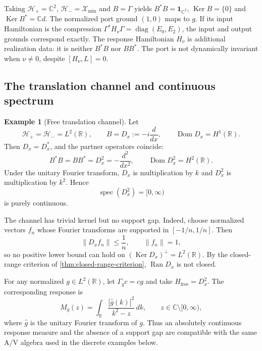 \documentclass[11pt,reqno]{scrartcl}
\newcommand{\CC}{\mathbb C}
\newcommand{\RR}{\mathbb R}
\newcommand{\scrHp}{\mathscr H_{+}}
\newcommand{\scrHm}{\mathscr H_{-}}
\newcommand{\idop}{\mathbf 1}
\DeclareMathOperator{\Dom}{Dom}
\DeclareMathOperator{\Ran}{Ran}
\DeclareMathOperator{\Ker}{Ker}
\DeclareMathOperator{\spec}{spec}
\DeclareMathOperator{\diag}{diag}
\newcommand{\Hmin}{\mathscr X_{\min}}
\theoremstyle{plain}
\theoremstyle{definition}
\newtheorem{example}[example]{Example}
\theoremstyle{remark}
\begin{document}
Taking $\scrHp=\CC^2$, $\scrHm=\Hmin$ and $B=\Gamma$ yields
$B^*B=\idop_{\CC^2}$, $\Ker B=\{0\}$ and $\Ker B^*=\CC d$.
The normalized port ground $(1,0)$ maps to $g$.  If its input Hamiltonian
is the compression $\Gamma^*H_\nu\Gamma=\diag(E_0,E_2)$, the input
and output grounds correspond exactly.  The response Hamiltonian
$H_\nu$ is additional realization data: it is neither $B^*B$ nor $BB^*$.
The port is not dynamically invariant when $\nu\ne0$, despite
$[H_\nu,L]=0$.


\subsection{The translation channel and continuous spectrum}

\begin{example}[Free translation channel]
\label{ex:translation-channel}
Let
\begin{equation}
  \scrHp=\scrHm=L^2(\RR),
  \qquad
  B=D_x:=-i\frac{d}{dx},
  \qquad
  \Dom D_x=H^1(\RR).
  \label{eq:translation-channel}
\end{equation}
Then \(D_x=D_x^*\), and the partner operators coincide:
\begin{equation}
  B^*B=BB^*=D_x^2=-\frac{d^2}{dx^2},
  \qquad
  \Dom D_x^2=H^2(\RR).
  \label{eq:free-partner}
\end{equation}
Under the unitary Fourier transform, \(D_x\) is multiplication by \(k\) and
\(D_x^2\) is multiplication by \(k^2\).  Hence
\begin{equation}
  \spec(D_x^2)=[0,\infty)
  \label{eq:free-spectrum}
\end{equation}
is purely continuous.
\end{example}

The channel has trivial kernel but no support gap.  Indeed, choose normalized
vectors \(f_n\) whose Fourier transforms are supported in
\([-1/n,1/n]\).  Then
\begin{equation}
  \|D_xf_n\|\le\frac1n,
  \qquad
  \|f_n\|=1,
  \label{eq:no-translation-gap}
\end{equation}
so no positive lower bound can hold on \((\Ker D_x)^\perp=L^2(\RR)\).  By the
closed-range criterion of \cref{thm:closed-range-criterion}, \(\Ran D_x\) is not
closed.

For any normalized \(g\in L^2(\RR)\), let
\(\Gamma_gc=cg\) and take \(H_{\mathrm{free}}=D_x^2\).  The corresponding
response is
\begin{equation}
  M_g(z)
  =\int_{\RR}\frac{|\widehat g(k)|^2}{k^2-z}\,dk,
  \qquad z\in\CC\setminus[0,\infty),
  \label{eq:free-response}
\end{equation}
where \(\widehat g\) is the unitary Fourier transform of \(g\).  Thus an
absolutely continuous response measure and the absence of a support gap are
compatible with the same A/V algebra used in the discrete examples below.
\end{document}

